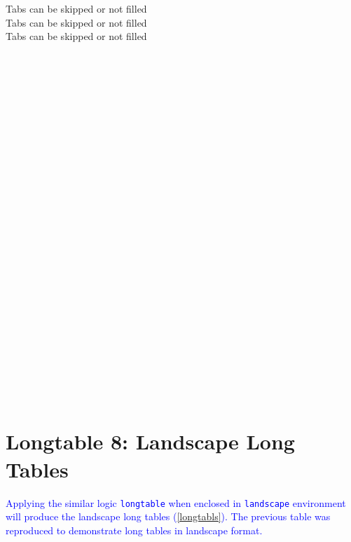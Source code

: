 \documentclass[phd]{ndsu-thesis-2022}
\newcommand\italk[1]{\textcolor{blue}{#1}}  %
\begin{document}
\begin{tabbing}
\>Tabs can be skipped or not filled\\ 
\>\>Tabs can be skipped or not filled\\ 
\>\>\>Tabs can be skipped or not filled\\ 
    \\
    \\
    \\
    \\
    \\
    \\
    \\
    \\
    \\
    \\
    \\
    \\
    \\
    \\
    \\
    \\
    \\
    \\
    \\
    \\
    \\
    \\
    \\
    \\
    \\
    \\
\end{tabbing}
\endgroup

\vspace{-4ex}
\kant[9]

\section{Longtable 8: Landscape Long Tables}
\italk{Applying the similar logic \texttt{longtable} when enclosed in \texttt{landscape} environment will produce the landscape long tables (\cref{longtabls}). The previous table was reproduced to demonstrate long tables in landscape format.}
\end{document}
